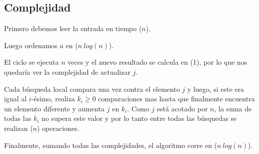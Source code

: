 \subsection{Complejidad}

Primero debemos leer la entrada en tiempo \bigo($n$).

Luego ordenamos $a$ en \bigo($n\ log(n)$).

El ciclo se ejecuta $n$ veces y el nuevo resultado se calcula en \bigo(1),
por lo que nos quedaría ver la complejidad de actualizar $j$.

Cada búsqueda local compara una vez contra el elemento $j$ y luego, si este era igual al $i$-ésimo,
realiza $k_i \geq 0$ comparaciones mas hasta que finalmente encuentra un elemento diferente y aumenta
$j$ en $k_i$. Como $j$ está acotado por $n$, la suma de todas las $k_i$ no supera este valor y por lo
tanto entre todas las búsquedas se realizan \bigo($n$) operaciones.

Finalmente, sumando todas las complejidades, el algoritmo corre en \bigo($n\ log(n)$).
